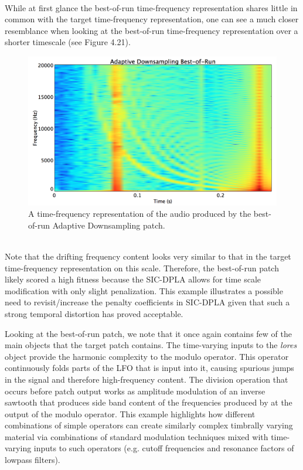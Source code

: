 \documentclass[a4paper,12pt]{report} 	%
\numberwithin{figure}{chapter}
\numberwithin{table}{chapter}
\numberwithin{equation}{chapter}
\begin{document}
\begin{flushleft}
\begin{figure}[h!]
\end{figure}
\\
While at first glance the best-of-run time-frequency representation shares little in common with the target time-frequency representation, one can see a much closer resemblance when looking at the best-of-run time-frequency representation over a shorter timescale (see Figure 4.21).
\begin{figure}[h!]
\begin{center}
\includegraphics[scale=0.35,width=\linewidth]{AdaptiveDownsamplingBestOfRunSTFT2}
\caption[Best-of-Run Adaptive Downsampling Time-Frequency Representation]{A time-frequency representation of the audio produced by the best-of-run Adaptive Downsampling patch.}
\end{center}
\end{figure}
\\
Note that the drifting frequency content looks very similar to that in the target time-frequency representation on this scale. Therefore, the best-of-run patch likely scored a high fitness because the SIC-DPLA allows for time scale modification with only slight penalization. This example illustrates a possible need to revisit/increase the penalty coefficients in SIC-DPLA given that such a strong temporal distortion has proved acceptable.

Looking at the best-of-run patch, we note that it once again contains few of the main objects that the target patch contains. The time-varying inputs to the \emph{lores\texttildelow{}} object provide the harmonic complexity to the modulo operator. This operator continuously folds parts of the LFO that is input into it, causing spurious jumps in the signal and therefore high-frequency content. The division operation that occurs before patch output works as amplitude modulation of an inverse sawtooth that produces side band content of the frequencies produced by at the output of the modulo operator. This example highlights how different combinations of simple operators can create similarly complex timbrally varying material via combinations of standard modulation techniques mixed with time-varying inputs to such operators (e.g. cutoff frequencies and resonance factors of lowpass filters). 


\end{flushleft}
\end{document}
